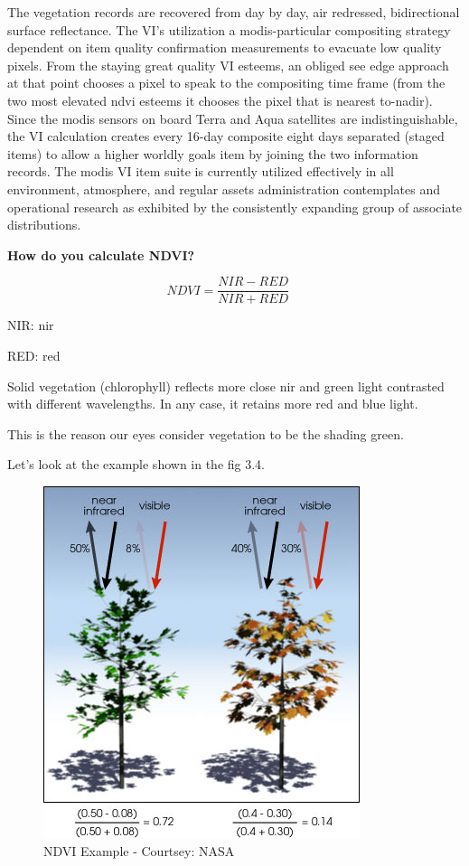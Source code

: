 The vegetation records are recovered from day by day, air redressed, bidirectional surface reflectance. The VI's utilization a \gls{modis}-particular compositing strategy dependent on item quality confirmation measurements to evacuate low quality pixels. From the staying great quality VI esteems, an obliged see edge approach at that point chooses a pixel to speak to the compositing time frame (from the two most elevated \gls{ndvi} esteems it chooses the pixel that is nearest to-nadir). Since the \gls{modis} sensors on board Terra and Aqua satellites are indistinguishable, the VI calculation creates every 16-day composite eight days separated (staged items) to allow a higher worldly goals item by joining the two information records. The \gls{modis} VI item suite is currently utilized effectively in all environment, atmosphere, and regular assets administration contemplates and operational research as exhibited by the consistently expanding group of associate distributions. \\

\centerline{\textbf{How do you calculate NDVI?}}

\textbf{\[ NDVI = \frac{NIR - RED}{NIR + RED} \ \ \ 
\ \ \]}

\centerline{NIR: \gls{nir}}
\centerline{RED: \gls{red}}

Solid vegetation (chlorophyll) reflects more close \gls{nir} and green light contrasted with different wavelengths. In any case, it retains more red and blue light. 

This is the reason our eyes consider vegetation to be the shading green.

Let's look at the example shown in the fig 3.4.

    \begin{figure}[H]
            \centering
            \includegraphics[width=0.5\linewidth]{figures/ch3/ndvi-example.png}
            \caption{\label{fig:ndvi_example} NDVI Example - Courtsey: NASA}
    \end{figure}

